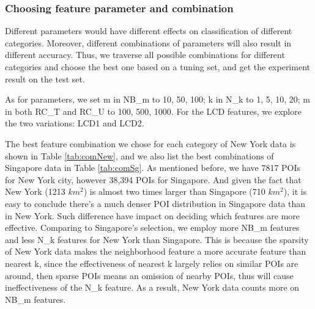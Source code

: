 \subsubsection{ Choosing feature parameter and combination}
\label{exp2}
Different parameters would have different effects on classification of different categories.
Moreover, different combinations of parameters will also result in different accuracy.
Thus, we traverse all possible combinations for different categories and choose
the best one based on a tuning set, and get the experiment result on the test set.

As for parameters, we set m in NB\_m to 10, 50, 100; k in N\_k to 1, 5, 10, 20;
m in both RC\_T and RC\_U to 100, 500, 1000. For the LCD features, we explore
the two variations: LCD1 and LCD2.

The best feature combination we chose for each category
of New York data is shown in Table \ref{tab:comNew}, and we also list the best
combinations of Singapore data in Table \ref{tab:comSg}.
As mentioned before, we have 7817 POIs for New York city, however 38,394 POIs for Singapore.
And given the fact that New York (1213 $km^2$) is almost two times larger
than Singapore (710 $km^2$), it is easy to conclude there's a much denser POI
distribution in Singapore data than in New York. Such difference
have impact on deciding which features are more effective.
Comparing to Singapore's selection, we employ more NB\_m features
and less N\_k features  for New York than Singapore. This is because
the sparsity of New York data makes the neighborhood feature
a more accurate feature than nearest k, since the effectiveness
of nearest k largely relies on similar POIs are around,
then sparse POIs means an omission of nearby POIs, thus will cause
ineffectiveness of the N\_k feature.
As a result, New York data counts more on NB\_m features.

